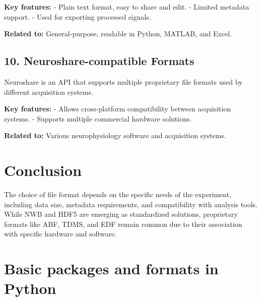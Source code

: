 \documentclass[a4paper,9pt]{extarticle}
\begin{document}
\begin{multicols}{2}
\textbf{Key features:}  
- Plain text format, easy to share and edit.  
- Limited metadata support.  
- Used for exporting processed signals.

\textbf{Related to:} General-purpose, readable in Python, MATLAB, and Excel.

\subsection*{10. Neuroshare-compatible Formats}
Neuroshare is an API that supports multiple proprietary file formats used by different acquisition systems.

\textbf{Key features:}  
- Allows cross-platform compatibility between acquisition systems.  
- Supports multiple commercial hardware solutions.

\textbf{Related to:} Various neurophysiology software and acquisition systems.

\section*{Conclusion}
The choice of file format depends on the specific needs of the experiment, including data size, metadata requirements, and compatibility with analysis tools. While NWB and HDF5 are emerging as standardized solutions, proprietary formats like ABF, TDMS, and EDF remain common due to their association with specific hardware and software.



\end{multicols}


\section{Basic packages and formats in Python}
\end{document}
